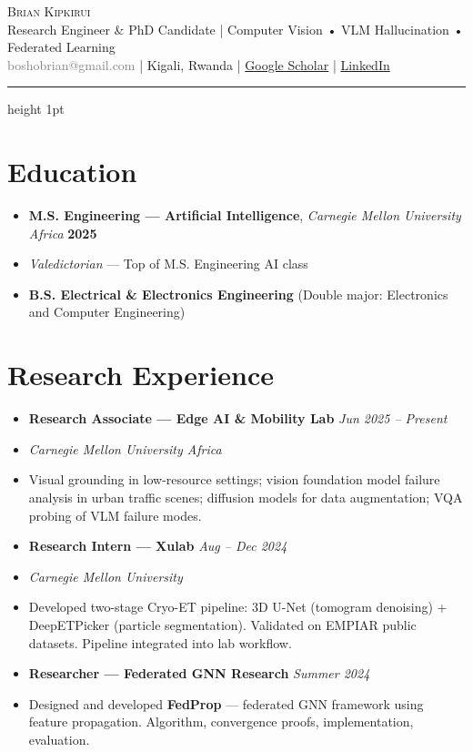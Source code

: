 \documentclass[11pt,letterpaper]{article}
\begin{document}
{\LARGE\scshape Brian Kipkirui}\\[4pt]
Research Engineer \& PhD Candidate | Computer Vision • VLM Hallucination • Federated Learning\\[4pt]
\textcolor{gray}{boshobrian@gmail.com} | Kigali, Rwanda | \href{https://scholar.google.com}{Google Scholar} | \href{https://linkedin.com/in/briankipkirui}{LinkedIn}\\[4pt]
\hrule height 1pt

\section{Education}
\begin{itemize}
    \item[] \textbf{M.S. Engineering — Artificial Intelligence}, \emph{Carnegie Mellon University Africa} \hfill \textbf{2025}
    \item[] \emph{Valedictorian} — Top of M.S. Engineering AI class
    \item[] \textbf{B.S. Electrical \& Electronics Engineering} (Double major: Electronics and Computer Engineering)
\end{itemize}

\section{Research Experience}
\begin{itemize}
    \item[] \textbf{Research Associate — Edge AI \& Mobility Lab} \hfill \emph{Jun 2025 – Present}
    \item[] \emph{Carnegie Mellon University Africa}
    \item[] Visual grounding in low-resource settings; vision foundation model failure analysis in urban traffic scenes; diffusion models for data augmentation; VQA probing of VLM failure modes.

    \item[] \textbf{Research Intern — Xulab} \hfill \emph{Aug – Dec 2024}
    \item[] \emph{Carnegie Mellon University}
    \item[] Developed two-stage Cryo-ET pipeline: 3D U-Net (tomogram denoising) + DeepETPicker (particle segmentation). Validated on EMPIAR public datasets. Pipeline integrated into lab workflow.

    \item[] \textbf{Researcher — Federated GNN Research} \hfill \emph{Summer 2024}
    \item[] Designed and developed \textbf{FedProp} — federated GNN framework using feature propagation. Algorithm, convergence proofs, implementation, evaluation.
\end{itemize}
\end{document}

